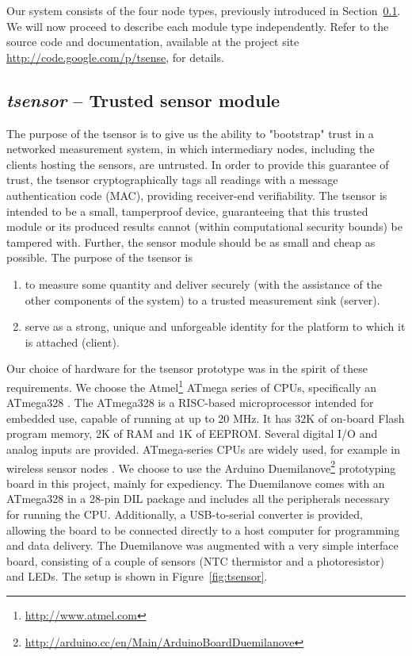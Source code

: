Our system consists of the four node types, previously introduced in Section~\ref{}. We will now proceed to describe each module type independently. Refer to the source code and documentation, available at the project site \url{http://code.google.com/p/tsense}, for details.

\subsection{\textit{tsensor} -- Trusted sensor module}

The purpose of the tsensor is to give us the ability to "bootstrap" trust in a networked measurement system, in which intermediary nodes, including the clients hosting the sensors, are untrusted. In order to provide this guarantee of trust, the tsensor cryptographically tags all readings with a message authentication code (MAC), providing receiver-end verifiability. The tsensor is intended to be a small, tamperproof device, guaranteeing that this trusted module or its produced results cannot (within computational security bounds) be tampered with. Further, the sensor module should be as small and cheap as possible.
%
The purpose of the tsensor is
\begin{enumerate}
\item to measure some quantity and deliver securely (with the assistance of the other components of the system) to a trusted measurement sink (server).
\item serve as a strong, unique and unforgeable identity for the platform to which it is attached (client).
\end{enumerate}

Our choice of hardware for the tsensor prototype was in the spirit of these requirements. We choose the Atmel\footnote{\url{http://www.atmel.com}} ATmega series of CPUs, specifically an ATmega328 \cite{atmel-atmega-series-2010}. The ATmega328 is a RISC-based microprocessor intended for embedded use, capable of running at up to 20 MHz. It has 32K of on-board Flash program memory, 2K of RAM and 1K of EEPROM. Several digital I/O and analog inputs are provided. ATmega-series CPUs are widely used, for example in wireless sensor nodes .
%
We choose to use the Arduino Duemilanove\footnote{\url{http://arduino.cc/en/Main/ArduinoBoardDuemilanove}} prototyping board in this project, mainly for expediency. The Duemilanove comes with an ATmega328 in a  28-pin DIL package and includes all the peripherals necessary for running the CPU. Additionally, a USB-to-serial converter is provided, allowing the board to be connected directly to a host computer for programming and data delivery.
%
The Duemilanove was augmented with a very simple interface board, consisting of a couple of sensors (NTC thermistor and a photoresistor) and LEDs. The setup is shown in Figure~\ref{fig:tsensor}.
%

